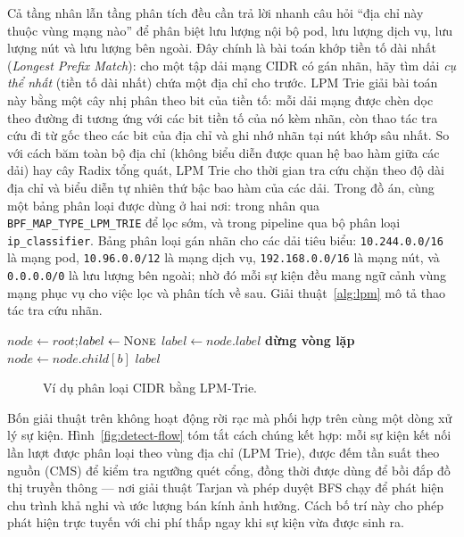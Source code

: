 Cả tầng nhân lẫn tầng phân tích đều cần trả lời nhanh câu hỏi ``địa chỉ này thuộc
vùng mạng nào'' để phân biệt lưu lượng nội bộ pod, lưu lượng dịch vụ, lưu lượng nút
và lưu lượng bên ngoài. Đây chính là bài toán khớp tiền tố dài nhất
(\textit{Longest Prefix Match}): cho một tập dải mạng CIDR có gán nhãn, hãy tìm dải
\emph{cụ thể nhất} (tiền tố dài nhất) chứa một địa chỉ cho trước. LPM Trie giải bài
toán này bằng một cây nhị phân theo bit của tiền tố: mỗi dải mạng được chèn dọc theo
đường đi tương ứng với các bit tiền tố của nó kèm nhãn, còn thao tác tra cứu đi từ
gốc theo các bit của địa chỉ và ghi nhớ nhãn tại nút khớp sâu nhất. So với cách băm
toàn bộ địa chỉ (không biểu diễn được quan hệ bao hàm giữa các dải) hay cây Radix
tổng quát, LPM Trie cho thời gian tra cứu chặn theo độ dài địa chỉ và biểu diễn tự
nhiên thứ bậc bao hàm của các dải. Trong đồ án, cùng một bảng phân loại được dùng ở
hai nơi: trong nhân qua \texttt{BPF\_MAP\_TYPE\_LPM\_TRIE} để lọc sớm, và trong
pipeline qua bộ phân loại \texttt{ip\_classifier}. Bảng phân loại gán nhãn cho các
dải tiêu biểu: \texttt{10.244.0.0/16} là mạng pod, \texttt{10.96.0.0/12} là mạng
dịch vụ, \texttt{192.168.0.0/16} là mạng nút, và \texttt{0.0.0.0/0} là lưu lượng bên
ngoài; nhờ đó mỗi sự kiện đều mang ngữ cảnh vùng mạng phục vụ cho việc lọc và phân
tích về sau. Giải thuật~\ref{alg:lpm} mô tả thao tác tra cứu nhãn.

\begin{algorithm}[H]
\caption{LPM Trie --- tra cứu nhãn theo tiền tố dài nhất}
\label{alg:lpm}
\begin{algorithmic}[1]
  \State $node \gets root$;\quad $label \gets \textsc{None}$
     \State $label \gets node.label$ \EndIf
     \State \textbf{dừng vòng lặp} \EndIf
    \State $node \gets node.child[b]$
  \EndFor
  \State \Return $label$ 
\EndFunction
\end{algorithmic}
\end{algorithm}

\begin{figure}[H]
  \centering
  \resizebox{0.96\linewidth}{!}{}
  \caption{Ví dụ phân loại CIDR bằng LPM-Trie.}
  \label{fig:lpm-ex}
\end{figure}

Bốn giải thuật trên không hoạt động rời rạc mà phối hợp trên cùng một dòng xử lý sự
kiện. Hình~\ref{fig:detect-flow} tóm tắt cách chúng kết hợp: mỗi sự kiện kết nối lần
lượt được phân loại theo vùng địa chỉ (LPM Trie), được đếm tần suất theo nguồn (CMS)
để kiểm tra ngưỡng quét cổng, đồng thời được dùng để bồi đắp đồ thị truyền thông ---
nơi giải thuật Tarjan và phép duyệt BFS chạy để phát hiện chu trình khả nghi và ước
lượng bán kính ảnh hưởng. Cách bố trí này cho phép phát hiện trực tuyến với chi phí
thấp ngay khi sự kiện vừa được sinh ra.

